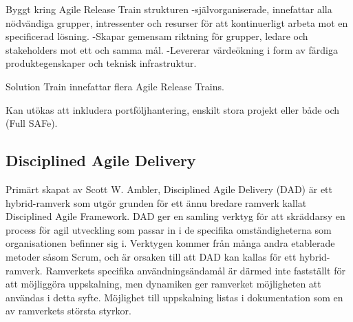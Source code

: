 		Byggt kring Agile Release Train strukturen
		-självorganiserade, innefattar alla nödvändiga grupper, intressenter och resurser för att kontinuerligt arbeta mot en specificerad lösning.
		-Skapar gemensam riktning för grupper, ledare och stakeholders mot ett och samma mål.
		-Levererar värdeökning i form av färdiga produktegenskaper och teknisk infrastruktur.

		Solution Train innefattar flera Agile Release Trains.
		
		Kan utökas att inkludera portföljhantering, enskilt stora projekt eller både och (Full SAFe).
				
		
			
		
	\subsection{Disciplined Agile Delivery}
			
		Primärt skapat av Scott W. Ambler, Disciplined Agile Delivery (DAD) är ett hybrid-ramverk som utgör grunden för ett ännu bredare ramverk kallat Disciplined Agile Framework. DAD ger en samling verktyg för att skräddarsy en process för agil utveckling som passar in i de specifika omständigheterna som organisationen befinner sig i. Verktygen kommer från många andra etablerade metoder såsom Scrum, och är orsaken till att DAD kan kallas för ett hybrid-ramverk. Ramverkets specifika användningsändamål är därmed inte fastställt för att möjliggöra uppskalning, men dynamiken ger ramverket möjligheten att användas i detta syfte. Möjlighet till uppskalning listas i dokumentation som en av ramverkets största styrkor. \cite{dad_web}
		
